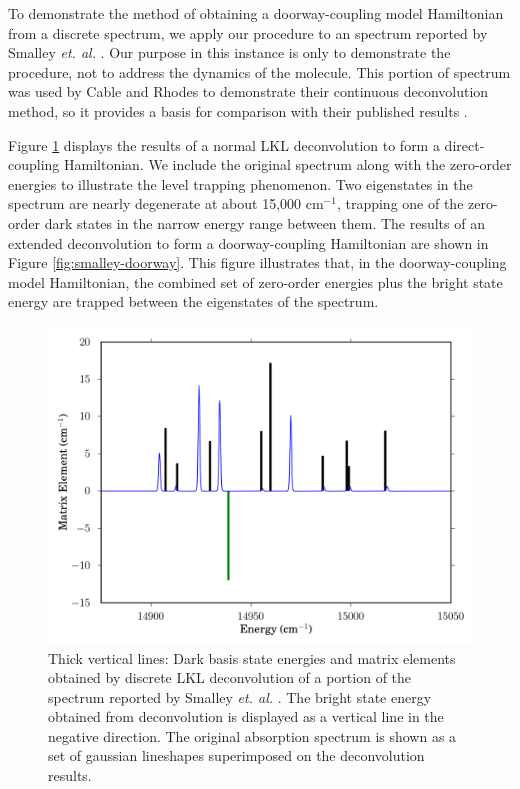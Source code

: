 To demonstrate the method of obtaining a doorway-coupling model
Hamiltonian from a discrete spectrum, we apply our procedure to an
 spectrum reported by Smalley \emph{et. al.} \cite{smalley75}.
Our purpose in this instance is only to demonstrate the procedure, not
to address the dynamics of the  molecule. This portion of
spectrum was used by Cable and Rhodes to demonstrate their continuous
deconvolution method, so it provides a basis for comparison with their
published results \cite{cable80}.

Figure \ref{fig:smalley-direct} displays the results of a normal LKL
deconvolution to form a direct-coupling Hamiltonian.  We include the
original spectrum along with the zero-order energies to illustrate the
level trapping phenomenon.  Two eigenstates in the spectrum are nearly
degenerate at about 15,000 cm$^{-1}$, trapping one of the zero-order
dark states in the narrow energy range between them.  The results of
an extended deconvolution to form a doorway-coupling Hamiltonian are
shown in Figure \ref{fig:smalley-doorway}.  This figure illustrates
that, in the doorway-coupling model Hamiltonian, the combined set of
zero-order energies plus the bright state energy are trapped between
the eigenstates of the spectrum.  

\begin{figure}
  \caption{Thick vertical lines: Dark basis state energies and matrix
    elements obtained by discrete LKL deconvolution of a portion of the
     spectrum reported by Smalley \emph{et. al.}
    \cite{smalley75}.  The bright state energy obtained from
    deconvolution is displayed as a vertical line in the negative
    direction.  The original absorption spectrum is shown as a set of
    gaussian lineshapes superimposed on the deconvolution results.}
  \label{fig:smalley-direct}
  \centering
  \includegraphics[width=6in]{smalley-direct.png}
\end{figure}

